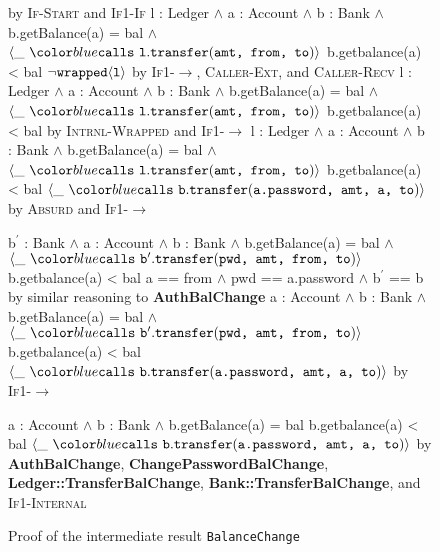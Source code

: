 \begin{figure}[t]
\begin{proofexample}
{\begin{proofexample}
{{						}
					{by \textsc{If-Start} and \textsc{If1-If}}
			}
			{\proofstepwithrule
				{\onlyIfSingleEx
						{l : Ledger $\wedge$ a : Account $\wedge$ b : Bank $\wedge$ b.getBalance(a) = bal $\wedge$ $\calls{\_}{\texttt{l}}{\texttt{transfer}}{\texttt{amt, from, to}}$}
						{b.getbalance(a) < bal}
						{$\neg\texttt{wrapped}\langle \texttt{l} \rangle$}
						}
					{by \textsc{If1-}$\longrightarrow$, \textsc{Caller-Ext}, and \textsc{Caller-Recv}}
			}
			{\proofstepwithrule
				{\onlyIfSingleEx
						{l : Ledger $\wedge$ a : Account $\wedge$ b : Bank $\wedge$ b.getBalance(a) = bal $\wedge$ $\calls{\_}{\texttt{l}}{\texttt{transfer}}{\texttt{amt, from, to}}$}
						{b.getbalance(a) < bal}
						{\false}
						}
					{by \textsc{Intrnl-Wrapped} and \textsc{If1-}$\longrightarrow$}
			}
			{\proofstepwithrule
				{\onlyIfSingleEx
						{l : Ledger $\wedge$ a : Account $\wedge$ b : Bank $\wedge$ b.getBalance(a) = bal $\wedge$ $\calls{\_}{\texttt{l}}{\texttt{transfer}}{\texttt{amt, from, to}}$}
						{b.getbalance(a) < bal}
						{$\calls{\_}{\texttt{b}}{\texttt{transfer}}{\texttt{a.password, amt, a, to}}$}
						}
					{by \textsc{Absurd} and \textsc{If1-}$\longrightarrow$}
			}
		\endproofsteps
	\end{proofexample}
	}
	{
	\begin{proofexample}
			{\proofstepwithrule
				{\onlyIfSingleEx
						{b$^\prime$ : Bank $\wedge$ a : Account $\wedge$ b : Bank $\wedge$ b.getBalance(a) = bal $\wedge$ $\calls{\_}{\texttt{b$^\prime$}}{\texttt{transfer}}{\texttt{pwd, amt, from, to}}$}
						{b.getbalance(a) < bal}
						{a == from $\wedge$ pwd == a.password $\wedge$ b$^\prime$ == b}
						}
					{by similar reasoning to \textbf{AuthBalChange}}
			}
			{\proofstepwithrule
				{\onlyIfSingleEx
						{a : Account $\wedge$ b : Bank $\wedge$ b.getBalance(a) = bal $\wedge$ $\calls{\_}{\texttt{b$^\prime$}}{\texttt{transfer}}{\texttt{pwd, amt, from, to}}$}
						{b.getbalance(a) < bal}
						{$\calls{\_}{\texttt{b}}{\texttt{transfer}}{\texttt{a.password, amt, a, to}}$}
						}
					{by \textsc{If1-}$\longrightarrow$}
			}
		\endproofsteps
	\end{proofexample}
	}
	{\proofstepwithrule
			{\onlyIfSingleEx
					{a : Account $\wedge$ b : Bank $\wedge$ b.getBalance(a) = bal}
					{b.getbalance(a) < bal}
					{$\calls{\_}{\texttt{b}}{\texttt{transfer}}{\texttt{a.password, amt, a, to}}$}
					}
				{by \textbf{AuthBalChange}, \textbf{ChangePasswordBalChange}, \textbf{Ledger::TransferBalChange}, \textbf{Bank::TransferBalChange}, and \textsc{If1-Internal}}
		}
\endproofsteps
\end{proofexample}
\caption{Proof of the intermediate result \texttt{BalanceChange}}
\end{figure}

